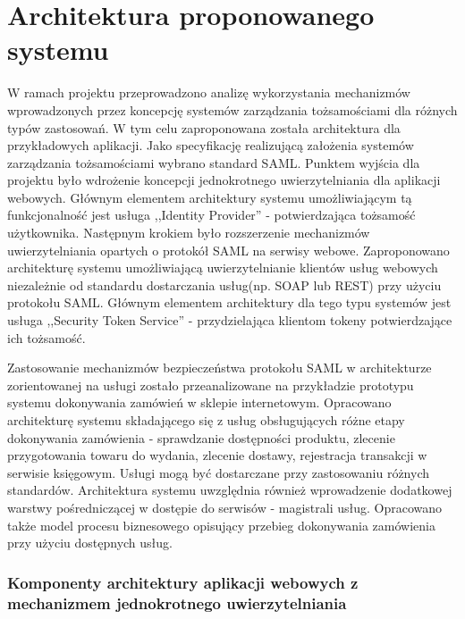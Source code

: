 \chapter{Architektura proponowanego systemu}
\label{cha:architektura}

{\it

W ramach projektu przeprowadzono analizę wykorzystania mechanizmów wprowadzonych przez koncepcję systemów zarządzania tożsamościami dla różnych typów zastosowań. W tym celu zaproponowana została architektura dla przykładowych aplikacji. Jako specyfikację realizującą założenia systemów zarządzania tożsamościami wybrano standard SAML. Punktem wyjścia dla projektu było wdrożenie koncepcji jednokrotnego uwierzytelniania dla aplikacji webowych. Głównym elementem architektury systemu umożliwiającym tą funkcjonalność jest usługa ,,Identity Provider'' - potwierdzająca tożsamość użytkownika. Następnym krokiem było rozszerzenie mechanizmów uwierzytelniania opartych o protokół SAML na serwisy webowe. Zaproponowano architekturę systemu umożliwiającą uwierzytelnianie klientów usług webowych niezależnie od standardu dostarczania usług(np. SOAP lub REST) przy użyciu protokołu SAML. Głównym elementem architektury dla tego typu systemów jest usługa ,,Security Token Service'' - przydzielająca klientom tokeny potwierdzające ich tożsamość. 

Zastosowanie mechanizmów bezpieczeństwa protokołu SAML w architekturze zorientowanej na usługi zostało przeanalizowane na przykładzie prototypu systemu dokonywania zamówień w sklepie internetowym. Opracowano architekturę systemu składającego się z usług obsługujących różne etapy dokonywania zamówienia - sprawdzanie dostępności produktu, zlecenie przygotowania towaru do wydania, zlecenie dostawy, rejestracja transakcji w serwisie księgowym. Usługi  mogą być dostarczane przy zastosowaniu różnych standardów. Architektura systemu uwzględnia również wprowadzenie dodatkowej warstwy pośredniczącej w dostępie do serwisów - magistrali usług. Opracowano także model procesu biznesowego opisujący przebieg dokonywania zamówienia przy użyciu dostępnych usług. 

}


\label{sec:komponenty}

	\subsection{Komponenty architektury aplikacji webowych z mechanizmem jednokrotnego uwierzytelniania}

